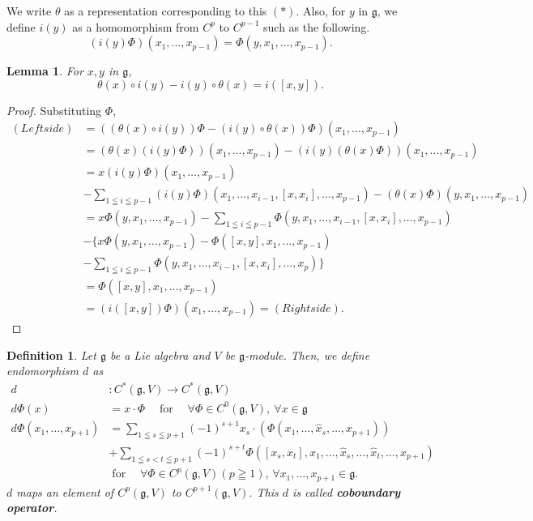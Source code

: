 \documentclass[titlepage,12pt]{article}
\newtheorem{defi}{Definition}[section]
\newtheorem{lem}{Lemma}[section]
\newcommand{\g}{\mathfrak{g}}
\begin{document}
We write $\theta$ as a representation corresponding to this $(\ast)$. Also, for $y$ in $\g$,
we define $i(y)$ as a homomorphism from $C^{p}$ to $C^{p-1}$ such as the following.
\begin{equation*}
(i(y)\Phi)(x_{1},\dots,x_{p-1}) = \Phi(y,x_{1},\dots,x_{p-1}).
\end{equation*}
\begin{lem}
For $x,y$ in $\g$,
\begin{equation*}
\theta(x) \circ i(y) - i(y) \circ \theta(x) = i([x,y]) .
\end{equation*}
\end{lem}

\begin{proof}
Substituting $\Phi$,
\begin{align*}
(Left side) &= ((\theta(x) \circ i(y))\Phi - (i(y) \circ
\theta(x))\Phi)(x_{1},\dots,x_{p-1}) \\
&= (\theta(x)(i(y)\Phi))(x_{1},\dots,x_{p-1}) -
(i(y)(\theta(x)\Phi))(x_{1},\dots,x_{p-1}) \\
		&= x(i(y)\Phi)(x_{1},\dots,x_{p-1}) \\ 
& - \sum_{1 \leqq i \leqq
p-1}(i(y)\Phi)(x_{1},\dots,x_{i-1},[x,x_{i}],\dots,x_{p-1}) -
(\theta(x)\Phi)(y,x_{1},\dots,x_{p-1}) \\
&= x\Phi(y,x_{1},\dots,x_{p-1}) - \sum_{1 \leqq i \leqq
p-1}\Phi(y,x_{1},\dots,x_{i-1},[x,x_{i}],\dots,x_{p-1}) \\
& - \bigl\{ x\Phi(y,x_{1},\dots,x_{p-1}) -
\Phi([x,y],x_{1},\dots,x_{p-1}) \\ & - \sum_{1 \leqq i \leqq
p-1}\Phi(y,x_{1},\dots,x_{i-1},[x,x_{i}],\dots,x_{p})\bigr\} \\
		&=\Phi([x,y],x_{1},\dots,x_{p-1}) \\
		&=(i([x,y])\Phi)(x_{1},\dots,x_{p-1}) = (Right side).
\end{align*}
\end{proof}

\begin{defi}
Let $\g$ be a Lie algebra and $V$ be $\g$-module. Then, we define endomorphism $d$ as 
\begin{align*}
d &: C^{*}(\g,V) \longrightarrow C^{*}(\g,V) \\
d\Phi(x) &= x \cdot \Phi \quad \operatorname{for} \quad \forall \Phi
\in C^{0}(\g,V), \ \forall x \in \g \\
d\Phi(x_{1},\dots,x_{p+1}) &= \sum_{1 \leqq s \leqq
p+1}(-1)^{s+1} x_{s} \cdot
(\Phi(x_{1},\dots,\hat{x}_{s},\dots,x_{p+1})) \\
& + \sum_{1 \leqq s < t \leqq
p+1}(-1)^{s+t}\Phi([x_{s},x_{t}],x_{1},\dots,\hat{x}_{s},\dots,\hat{x}_{t},\dots,x_{p+1})
\\
& \operatorname{for} \quad \forall \Phi \in C^{p}(\g,V)(p \geqq 1), \,
\forall x_{1},\dots,x_{p+1} \in \g.
\end{align*}
$d$ maps an element of $C^{p}(\mathfrak{g},V)$ to $C^{p+1}(\mathfrak{g},V)$. This $d$ is called \textbf{coboundary operator}.
\end{defi}
\end{document}
